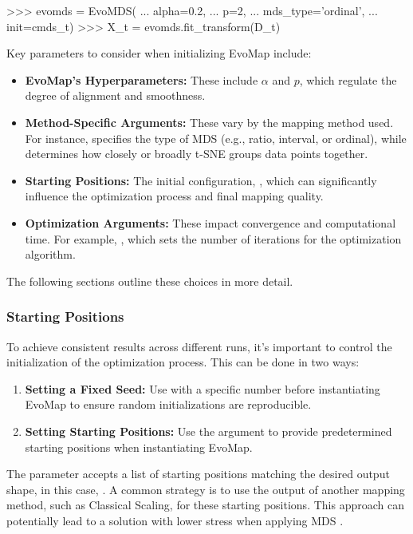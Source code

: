 \documentclass[article]{jss}
\begin{document}
\begin{Code}
>>> evomds = EvoMDS(
...     alpha=0.2, 
...     p=2, 
...     mds_type='ordinal', 
...     init=cmds_t)                  
>>> X_t = evomds.fit_transform(D_t)    
\end{Code}

Key parameters to consider when initializing EvoMap include:
\begin{itemize}
  \item \textbf{EvoMap's Hyperparameters:} These include $\alpha$ and $p$, which regulate the degree of alignment and smoothness.
  \item \textbf{Method-Specific Arguments:} These vary by the mapping method used. For instance,  %
  specifies the type of MDS (e.g., ratio, interval, or ordinal), while  determines how closely or %
  broadly t-SNE groups data points together. 
  \item \textbf{Starting Positions:} The initial configuration, , which can significantly influence the optimization process and final %
  mapping quality. 
  \item \textbf{Optimization Arguments:} These impact convergence and computational time. For example, , %
  which sets the number of iterations for the optimization algorithm.  
\end{itemize}

The following sections outline these choices in more detail. 

\subsubsection{Starting Positions}

To achieve consistent results across different runs, it's important to control the initialization of the optimization 
process. This can be done in two ways:

\begin{enumerate}
    \item \textbf{Setting a Fixed Seed:} Use  with a specific number before instantiating EvoMap to %
    ensure random initializations are reproducible.
    \item \textbf{Setting Starting Positions:} Use the  argument to provide predetermined starting positions when %
    instantiating EvoMap.
\end{enumerate}

The  parameter accepts a list of starting positions matching the desired output shape, in this case, 
. A common strategy is to use the output of another mapping method, such as Classical Scaling, for 
these starting positions. This approach can potentially lead to a solution with lower stress when applying MDS 
\citep{DeLeeuw+Mair:2009}.
\end{document}
